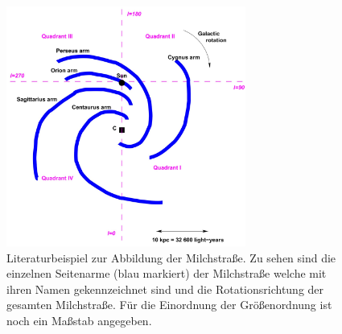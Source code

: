 \begin{figure}[H]
    \centering
    \includegraphics[width= 0.7\textwidth]{pngplots/milchstrasselit.png}   
    \caption[Literaturbeispiel zur Abbildung der Milchstraße]{Literaturbeispiel zur Abbildung der Milchstraße. Zu sehen sind die einzelnen Seitenarme (blau markiert) der Milchstraße welche mit ihren Namen gekennzeichnet sind und die Rotationsrichtung der gesamten Milchstraße. Für die Einordnung der Größenordnung ist noch ein Maßstab angegeben. \cite{H1}}
    \label{fig:Milchstrasselit}
\end{figure}